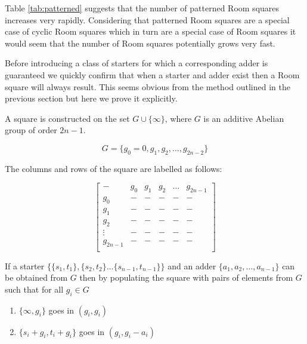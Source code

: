 Table \ref{tab:patterned} suggests that the number of patterned Room squares increases very rapidly.
Considering that patterned Room squares are a special case of cyclic Room squares which in turn are a special case of Room squares it would seem that the number of Room squares potentially grows very fast.

Before introducing a class of starters for which a corresponding adder is guaranteed we quickly confirm that when a starter and adder exist then a Room square will always result.
This seems obvious from the method outlined in the previous section but here we prove it explicitly.

\begin{example}
A square is constructed on the set $G \cup \{\infty\}$, where $G$ is an additive Abelian group of order $2n-1$.

\begin{equation*}
G = \{g_0 = 0, g_1, g_2, \ldots, g_{2n-2}\}
\end{equation*}

The columns and rows of the square are labelled as follows:

\begin{equation*}
  \begin{bmatrix}
        -      & g_0  &  g_1  &  g_2  & \ldots &  g_{2n - 1} \\
       g_0     &   -  &   -   &   -   &    -   &     -       \\
       g_1     &   -  &   -   &   -   &    -   &     -       \\
       g_2     &   -  &   -   &   -   &    -   &     -       \\
     \vdots    &   -  &   -   &   -   &    -   &     -       \\
    g_{2n - 1} &   -  &   -   &   -   &    -   &     -       \\
  \end{bmatrix}
\end{equation*}

If a starter
$\{\{s_1, t_1\}, \{s_2, t_2\} \ldots \{s_{n - 1}, t_{n - 1}\}\}$
and an adder
$\{a_1, a_2, \ldots, a_{n - 1}\}$
can be obtained from $G$ then by populating the square with pairs of elements from $G$ such that for all $g_i \in G$

\begin{enumerate}
  \item{$\{\infty, g_{i}\}$ goes in $(g_{i}, g_{i})$}
  \item{$\{s_{i} + g_{i}, t_{i} + g_{i}\}$ goes in $(g_{i}, g_{i} - a_{i})$}
\end{enumerate}
\label{eg:starter-adder}
\end{example}

